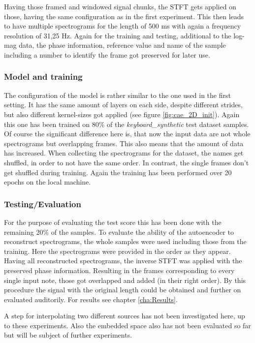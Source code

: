 Having those framed and windowed signal chunks, the STFT gets applied on those, having the same configuration as in the first experiment. This then leads to have multiple spectrograms for the length of 500 ms with again a frequency resolution of 31,25 Hz. Again for the training and testing, additional to the log-mag data, the phase information, reference value and name of the sample including a number to identify the frame got preserved for later use.

\subsubsection{Model and training}
The configuration of the model is rather similar to the one used in the first setting. It has the same amount of layers on each side, despite different strides, but also different kernel-sizes got applied (see figure \ref{fig:cae_2D_init}). Again this one has been trained on 80\% of the \textit{keyboard\_synthetic} test dataset samples. Of course the significant difference here is, that now the input data are not whole spectrograms but overlapping frames. This also means that the amount of data has increased. When collecting the spectrograms for the dataset, the names get shuffled, in order to not have the same order. In contrast, the single frames don't get shuffled during training. Again the training has been performed over 20 epochs on the local machine.

\subsubsection{Testing/Evaluation}
For the purpose of evaluating the test score this has been done with the remaining 20\% of the samples. To evaluate the ability of the autoencoder to reconstruct spectrograms, the whole samples were used including those from the training. Here the spectrograms were provided in the order as they appear. Having all reconstructed spectrograms, the inverse STFT was applied with the preserved phase information. Resulting in the frames corresponding to every single input note, those got overlapped and added (in their right order). By this procedure the signal with the original length could be obtained and further on evaluated auditorily. For results see chapter \ref{cha:Results}. 

A step for interpolating two different sources has not been investigated here, up to these experiments. Also the embedded space also has not been evaluated so far but will be subject of further experiments.

